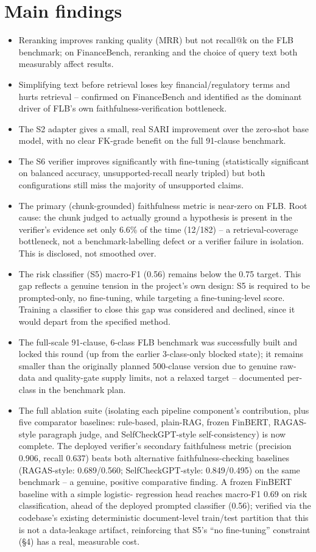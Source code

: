 \documentclass[11pt]{article}
\begin{document}
\section{Main findings}
\begin{itemize}
\item Reranking improves ranking quality (MRR) but not recall@k on the FLB benchmark; on
  FinanceBench, reranking and the choice of query text both measurably affect results.
\item Simplifying text before retrieval loses key financial/regulatory terms and hurts
  retrieval -- confirmed on FinanceBench and identified as the dominant driver of FLB's own
  faithfulness-verification bottleneck.
\item The S2 adapter gives a small, real SARI improvement over the zero-shot base model, with no
  clear FK-grade benefit on the full 91-clause benchmark.
\item The S6 verifier improves significantly with fine-tuning (statistically significant on
  balanced accuracy, unsupported-recall nearly tripled) but both configurations still miss the
  majority of unsupported claims.
\item The primary (chunk-grounded) faithfulness metric is near-zero on FLB. Root cause: the
  chunk judged to actually ground a hypothesis is present in the verifier's evidence set only
  6.6\% of the time (12/182) -- a retrieval-coverage bottleneck, not a benchmark-labelling
  defect or a verifier failure in isolation. This is disclosed, not smoothed over.
\item The risk classifier (S5) macro-F1 (0.56) remains below the 0.75 target. This gap reflects
  a genuine tension in the project's own design: S5 is required to be prompted-only, no
  fine-tuning, while targeting a fine-tuning-level score. Training a classifier to close this
  gap was considered and declined, since it would depart from the specified method.
\item The full-scale 91-clause, 6-class FLB benchmark was successfully built and locked this
  round (up from the earlier 3-class-only blocked state); it remains smaller than the originally
  planned 500-clause version due to genuine raw-data and quality-gate supply limits, not a
  relaxed target -- documented per-class in the benchmark plan.
\item The full ablation suite (isolating each pipeline component's contribution, plus five
  comparator baselines: rule-based, plain-RAG, frozen FinBERT, RAGAS-style paragraph judge, and
  SelfCheckGPT-style self-consistency) is now complete. The deployed verifier's secondary
  faithfulness metric (precision 0.906, recall 0.637) beats both alternative faithfulness-checking
  baselines (RAGAS-style: 0.689/0.560; SelfCheckGPT-style: 0.849/0.495) on the same benchmark --
  a genuine, positive comparative finding. A frozen FinBERT baseline with a simple logistic-
  regression head reaches macro-F1 0.69 on risk classification, ahead of the deployed prompted
  classifier (0.56); verified via the codebase's existing deterministic document-level train/test
  partition that this is not a data-leakage artifact, reinforcing that S5's ``no fine-tuning''
  constraint (\S4) has a real, measurable cost.
\end{itemize}
\end{document}
